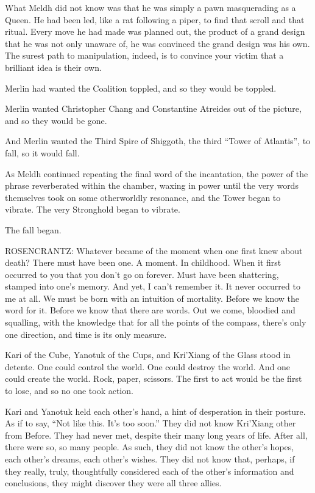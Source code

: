 What Meldh did not know was that he was simply a pawn masquerading as a Queen. He had been led, like a rat following a piper, to find that scroll and that ritual. Every move he had made was planned out, the product of a grand design that he was not only unaware of, he was convinced the grand design was his own. The surest path to manipulation, indeed, is to convince your victim that a brilliant idea is their own.

Merlin had wanted the Coalition toppled, and so they would be toppled.

Merlin wanted Christopher Chang and Constantine Atreides out of the picture, and so they would be gone.

And Merlin wanted the Third Spire of Shiggoth, the third “Tower of Atlantis”, to fall, so it would fall.

As Meldh continued repeating the final word of the incantation, the power of the phrase reverberated within the chamber, waxing in power until the very words themselves took on some otherworldly resonance, and the Tower began to vibrate. The very Stronghold began to vibrate.

The fall began.

\simpleline

ROSENCRANTZ: Whatever became of the moment when one first knew about death? There must have been one. A moment. In childhood. When it first occurred to you that you don’t go on forever. Must have been shattering, stamped into one’s memory. And yet, I can’t remember it. It never occurred to me at all. We must be born with an intuition of mortality. Before we know the word for it. Before we know that there are words. Out we come, bloodied and squalling, with the knowledge that for all the points of the compass, there’s only one direction, and time is its only measure.


Kari of the Cube, Yanotuk of the Cups, and Kri’Xiang of the Glass stood in detente. One could control the world. One could destroy the world. And one could create the world. Rock, paper, scissors. The first to act would be the first to lose, and so no one took action.

Kari and Yanotuk held each other’s hand, a hint of desperation in their posture.  As if to say, “Not like this. It’s too soon.” They did not know Kri’Xiang other from Before. They had never met, despite their many long years of life. After all, there were so, so many people. As such, they did not know the other’s hopes, each other’s dreams, each other’s wishes. They did not know that, perhaps, if they really, truly, thoughtfully considered each of the other’s information and conclusions, they might discover they were all three allies.

